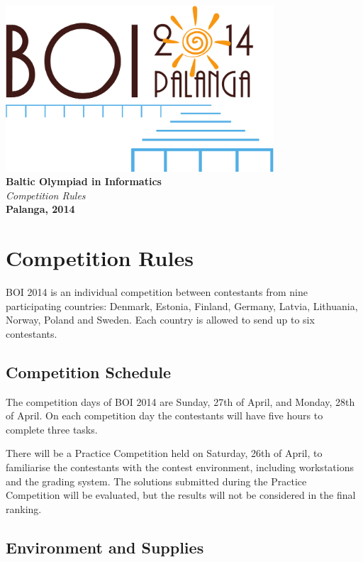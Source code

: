 \documentclass[a5paper,10pt,twoside]{book}
\begin{document}
\begin{titlepage}
\begin{center}
\includegraphics[width=10cm]{boi2014}\\[2cm]
{\bfseries\Huge Baltic Olympiad in Informatics}\\[1.5cm]
{\Huge\it Competition Rules}\\
\vfill
{\bfseries\LARGE Palanga, 2014}
\end{center}
\end{titlepage}

\chapter{Competition Rules}

BOI 2014 is an individual competition between contestants from nine
participating countries: Denmark, Estonia, Finland, Germany, Latvia, Lithuania,
Norway, Poland and Sweden. Each country is allowed to send up to six
contestants.

\section{Competition Schedule}

The competition days of BOI 2014 are Sunday, 27th of April, and Monday, 28th of
April. On each competition day the contestants will have five hours to complete
three tasks.

There will be a Practice Competition held on Saturday, 26th of April, to
familiarise the contestants with the contest environment, including workstations
and the grading system. The solutions submitted during the Practice Competition
will be evaluated, but the results will not be considered in the final ranking.

\section{Environment and Supplies}
\end{document}
